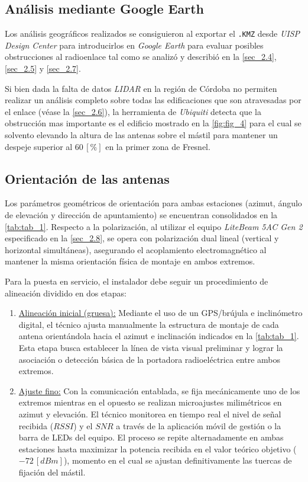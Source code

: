\subsection{Análisis mediante Google Earth}
\label{sec_2.18}
Los análisis geográficos realizados se consiguieron al exportar el \texttt{.KMZ} desde \textit{UISP Design Center} para introducirlos en \textit{Google Earth} para evaluar posibles obstrucciones al radioenlace tal como se analizó y describió en la \autoref{sec_2.4}, \autoref{sec_2.5} y \autoref{sec_2.7}. 

Si bien dada la falta de datos \textit{LIDAR} en la región de Córdoba no permiten realizar un análisis completo sobre todas las edificaciones que son atravesadas por el enlace (véase la \autoref{sec_2.6}), la herramienta de \textit{Ubiquiti} detecta que la obstrucción mas importante es el edificio mostrado en la \autoref{fig:fig_4} para el cual se solvento elevando la altura de las antenas sobre el mástil para mantener un despeje superior al $60 \, [\%]$ en la primer zona de Fresnel.



\subsection{Orientación de las antenas}
\label{sec_2.19}
Los parámetros geométricos de orientación para ambas estaciones (azimut, ángulo de elevación y dirección de apuntamiento) se encuentran consolidados en la \autoref{tab:tab_1}. Respecto a la polarización, al utilizar el equipo \textit{LiteBeam 5AC Gen 2} especificado en la \autoref{sec_2.8}, se opera con polarización dual lineal (vertical y horizontal simultáneas), asegurando el acoplamiento electromagnético al mantener la misma orientación física de montaje en ambos extremos.

Para la puesta en servicio, el instalador debe seguir un procedimiento de alineación dividido en dos etapas:
\begin{enumerate}
    \item \underline{Alineación inicial (gruesa):} Mediante el uso de un GPS/brújula e inclinómetro digital, el técnico ajusta manualmente la estructura de montaje de cada antena orientándola hacia el azimut e inclinación indicados en la \autoref{tab:tab_1}. Esta etapa busca establecer la línea de vista visual preliminar y lograr la asociación o detección básica de la portadora radioeléctrica entre ambos extremos.
    \item \underline{Ajuste fino:} Con la comunicación entablada, se fija mecánicamente uno de los extremos mientras en el opuesto se realizan microajustes milimétricos en azimut y elevación. El técnico monitorea en tiempo real el nivel de señal recibida ($RSSI$) y el $SNR$ a través de la aplicación móvil de gestión o la barra de LEDs del equipo. El proceso se repite alternadamente en ambas estaciones hasta maximizar la potencia recibida en el valor teórico objetivo ($-72 \, [dBm]$), momento en el cual se ajustan definitivamente las tuercas de fijación del mástil.
\end{enumerate}



